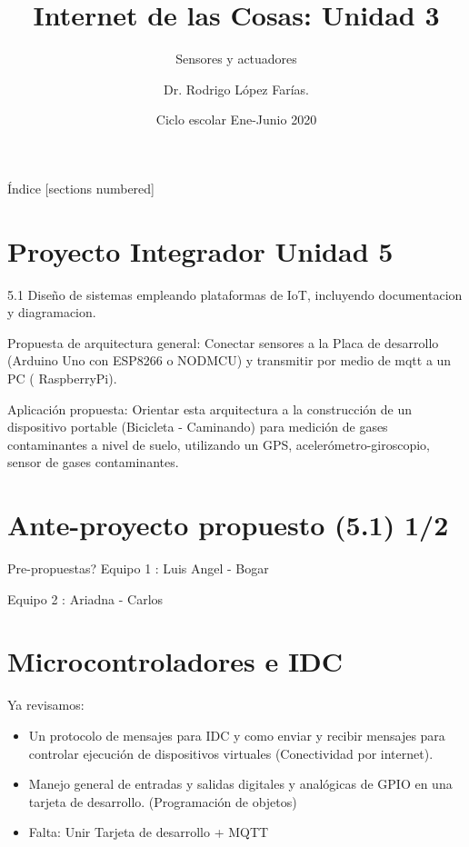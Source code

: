 \documentclass{beamer}
\title{Internet de las Cosas:  Unidad 3}
\subtitle{Sensores y actuadores}
\author{Dr. Rodrigo López Farías. \\}
\institute{Instituto Tecnológico de Querétaro \\ Ingeniería en Sistemas Computacionales}
\date{Ciclo escolar Ene-Junio 2020}
\theoremstyle{definition}
\begin{document}
\frame{\maketitle}


\begin{frame}{Índice}
  [sections numbered]
  \tableofcontents[hideallsubsections]
\end{frame}




\section{Proyecto Integrador Unidad 5}
\begin{frame}{5.1 Diseño de sistemas empleando plataformas de IoT, incluyendo documentacion y diagramacion.}

Propuesta de arquitectura general: Conectar sensores a la Placa de desarrollo (Arduino Uno con ESP8266 o NODMCU) y transmitir por medio de mqtt a un PC ( RaspberryPi).

Aplicación propuesta: Orientar esta arquitectura a la construcción de un dispositivo portable (Bicicleta - Caminando) para medición de gases contaminantes a nivel de suelo, utilizando un GPS, acelerómetro-giroscopio, sensor de gases contaminantes.
\end{frame}

\section{Ante-proyecto propuesto (5.1) 1/2}

\begin{frame}{Pre-propuestas?}
Equipo 1 :  Luis Angel - Bogar

Equipo 2 :  Ariadna - Carlos

\end{frame}

\section{Microcontroladores e IDC}

\begin{frame}
Ya revisamos:
\begin{itemize}
\item Un protocolo de mensajes para IDC y como enviar y recibir mensajes para controlar ejecución de dispositivos virtuales (Conectividad por internet). 
\item Manejo general de entradas y salidas digitales y analógicas de GPIO en una tarjeta de desarrollo. (Programación de objetos) 
\item Falta: Unir Tarjeta de desarrollo + MQTT 
\end{itemize}


\end{frame}
\end{document}
